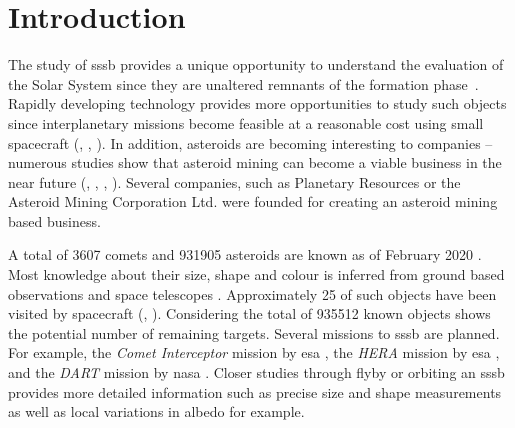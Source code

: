 \section{Introduction} \label{sec:introduction}


The study of \gls{sssb} provides a unique opportunity to understand the evaluation of the Solar System since they are unaltered remnants of the formation phase~\cite{walsh2018rubble, a2017comets}. Rapidly developing technology provides more opportunities to study such objects since interplanetary missions become feasible at a reasonable cost using small spacecraft (\cite{poghosyan2017cubesat}, \cite{andrews2019asteroid}, \cite{snodgrass2019europeanCI}).
In addition, asteroids are becoming interesting to companies -- numerous studies show that asteroid mining can become a viable business in the near future (\cite{andrews2015defining}, \cite{busch2004profitable}, \cite{weinzierl2018EconomicFrontier}, \cite{pittman2017deep}). Several companies, such as Planetary Resources \cite{lewicki2013planetary} or the Asteroid Mining Corporation Ltd. \cite{asteroidminingcorporation} were founded for creating an asteroid mining based business.

A total of \SI{3607}{} comets and \SI{931905}{} asteroids are known as of February 2020 \cite{nasaSBD_count}. Most knowledge about their size, shape and colour is inferred from ground based observations and space telescopes \cite{bowles2018castaway}. Approximately \SI{25}{} of such objects have been visited by spacecraft (\cite{wikipediaVisitedList}, \cite{nasaSBD_missions}). Considering the total of \SI{935512}{} known objects shows the potential number of remaining targets. Several missions to \gls{sssb} are planned. For example, the \textit{Comet Interceptor} mission by \gls{esa} \cite{snodgrass2019europeanCI}, the \textit{HERA} mission by \gls{esa} \cite{hera},  and the \textit{DART} mission by \gls{nasa} \cite{talbert_2017DART}. Closer studies through flyby or orbiting an \gls{sssb} provides more detailed information such as precise size and shape measurements as well as local variations in albedo for example.

